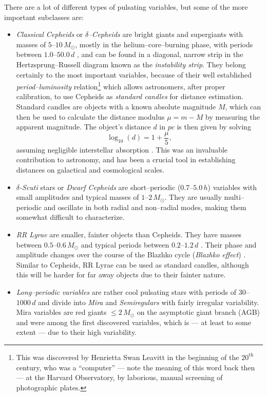 \begin{itemize}
There are a lot of different types of pulsating variables, but  some of the more important subclasses are:
	\begin{itemize}[label=$\circ$]
	\item \emph{Classical Cepheids} or \emph{$\delta$--Cepheids} are bright giants and supergiants with masses of $5$--$10 \, \unit{M_\odot}$, mostly in the helium--core--burning phase, with periods between $1.0$--$50.0 \, \unit{d}$ \citep{cox1980}, and can be found in a diagonal, narrow strip in the Hertzsprung--Russell diagram known as the \emph{instability strip}. They belong certainly to the most important variables, because of their well established \emph{period--luminosity} relation\footnote{This was discovered by Henrietta Swan Leavitt in the beginning of the $20^\text{th}$ century, who was a ``computer'' --- note the meaning of this word back then --- at the Harvard Observatory, by laborious, manual screening of photographic plates.}
	which allows astronomers, after proper calibration, to use Cepheids as \emph{standard candles} for distance estimation. Standard candles are objects with a known absolute magnitude $M$, which can then be used to calculate the distance modulus $\mu = m - M$ by measuring the apparent magnitude. The object's distance $d$ in $\unit{pc}$ is then given by solving
	\begin{equation}
	\log_{10}(d) = 1 + \frac{\mu}{5},
	\end{equation}
	assuming negligible interstellar absorption \citep{hanslmeier2007}. This was an invaluable contribution to astronomy, and has been a crucial tool in establishing distances on galactical and cosmological scales.
	\item \emph{$\delta$-Scuti} stars or \emph{Dwarf Cepheids} are short--periodic ($0.7$--$5.0 \, \unit{h}$) variables with small amplitudes and typical masses of $1$--$2 \, \unit{M_\odot}$. They are usually multi--periodic and oscillate in both radial and non--radial modes, making them somewhat difficult to characterize.
	\item \emph{RR Lyrae} are smaller, fainter objects than Cepheids. They have masses between $0.5$--$0.6 \, \unit{M_\odot}$ and typical periods between $0.2 $--$1.2 \, \unit{d}$ \citep{unsoeld2001}. Their phase and amplitude changes over the course of the Blazhko cycle (\emph{Blazhko effect}) \citep{soszy2008}. Similar to Cepheids, RR Lyrae can be used as standard candles, although this will be harder for far away objects due to their fainter nature.
	\item \emph{Long--periodic variables} are rather cool pulsating stars with periods of $30$--$1000 \, \unit{d}$ and divide into \emph{Mira} and \emph{Semiregulars} with fairly irregular variability. Mira variables are red giants $\le 2 \, \unit{M_\odot}$ on the asymptotic giant branch (AGB) \citep{unsoeld2001} and were among the first discovered variables, which is --- at least to some extent --- due to their high variability.
	\end{itemize}


\end{itemize}
